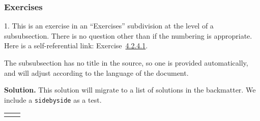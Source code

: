 \documentclass[10pt,]{article}
\theoremstyle{plain}
\theoremstyle{definition}
\theoremstyle{definition}
\theoremstyle{definition}
\theoremstyle{definition}
\theoremstyle{definition}
\theoremstyle{definition}
\numberwithin{equation}{section}
\newlength{\panelmax}
\begin{document}
\subsubsection[{Exercises}]{Exercises}\label{exercises-1}
\begin{exerciselist}
\item[1.]\hypertarget{exercise-test-number}{}\hypertarget{p-114}{}%
This is an exercise in an ``Exercises'' subdivision at the level of a subsubsection.  There is no question other than if the numbering is appropriate.  Here is a self-referential link: Exercise~\hyperlink{exercise-test-number}{4.2.4.1}.%
\par
\hypertarget{p-115}{}%
The subsubsection has no title in the source, so one is provided automatically, and will adjust according to the language of the document.%
\par\smallskip
\par\smallskip%
\noindent\textbf{Solution.}\hypertarget{solution-8}{}\quad%
\hypertarget{p-116}{}%
This solution will migrate to a list of solutions in the backmatter.  We include a \lstinline?sidebyside? as a test.%
{%
\setlength{\panelmax}{0pt}
\ifdefined\panelboxAp\else\newsavebox{\panelboxAp}\fi%
\ifdefined\phAp\else\newlength{\phAp}\fi%
\setlength{\phAp}{\ht\panelboxAp+\dp\panelboxAp}
\settototalheight{\phAp}{\usebox{\panelboxAp}}
\setlength{\panelmax}{\maxof{\panelmax}{\phAp}}
\ifdefined\panelboxBp\else\newsavebox{\panelboxBp}\fi%
\ifdefined\phBp\else\newlength{\phBp}\fi%
\setlength{\phBp}{\ht\panelboxBp+\dp\panelboxBp}
\settototalheight{\phBp}{\usebox{\panelboxBp}}
\setlength{\panelmax}{\maxof{\panelmax}{\phBp}}
\leavevmode%
\setlength{\tabcolsep}{0.1\linewidth}
\par\medskip\noindent
\hspace*{0.1\linewidth}%
\begin{tabular}{@{}*{2}{c}@{}}
\begin{minipage}[c][\panelmax][t]{0.3\linewidth}\usebox{\panelboxAp}\end{minipage}&
\begin{minipage}[c][\panelmax][t]{0.3\linewidth}\usebox{\panelboxBp}\end{minipage}\end{tabular}\\
}%
\end{exerciselist}
\typeout{************************************************}
\typeout{************************************************}
\end{document}
